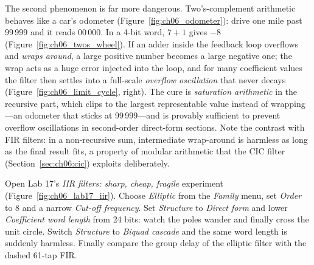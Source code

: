 
The second phenomenon is far more dangerous. Two's-complement arithmetic behaves like a car's
odometer (Figure~\ref{fig:ch06_odometer}): drive one mile past 99\,999 and it reads 00\,000. In a
4-bit word, $7+1$ gives $-8$ (Figure~\ref{fig:ch06_twos_wheel}). If an adder inside the feedback loop
overflows and \emph{wraps around}, a large positive number becomes a large negative one; the wrap
acts as a huge error injected into the loop, and for many coefficient values the filter then settles
into a full-scale \emph{overflow oscillation} that never decays (Figure~\ref{fig:ch06_limit_cycle},
right). The cure is \emph{saturation arithmetic} in the recursive part, which clips to the largest
representable value instead of wrapping---an odometer that sticks at 99\,999---and is provably
sufficient to prevent overflow oscillations in second-order direct-form sections. Note the contrast
with FIR filters: in a non-recursive sum, intermediate wrap-around is harmless as long as the
final result fits, a property of modular arithmetic that the CIC filter
(Section~\ref{sec:ch06:cic}) exploits deliberately.



\begin{tryit}
Open Lab 17's \emph{IIR filters: sharp, cheap, fragile} experiment (Figure~\ref{fig:ch06_lab17_iir}). Choose \emph{Elliptic} from the
\emph{Family} menu, set \emph{Order} to 8 and a narrow \emph{Cut-off frequency}. Set
\emph{Structure} to \emph{Direct form} and lower \emph{Coefficient word length} from 24 bits: watch
the poles wander and finally cross the unit circle. Switch \emph{Structure} to \emph{Biquad cascade}
and the same word length is suddenly harmless. Finally compare the group delay of the elliptic
filter with the dashed 61-tap FIR.
\end{tryit}

